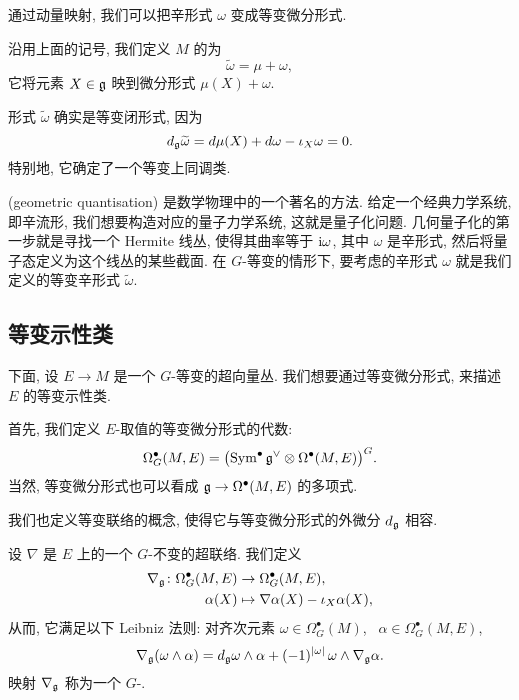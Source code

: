 通过动量映射, 我们可以把辛形式 $\omega$ 变成等变微分形式.

\begin{definition} \label{def-11-equivar-symp-form}
    沿用上面的记号, 我们定义 $M$ 的为
    \[ \widetilde{\omega} = \mu + \omega, \]
    它将元素 $X \in \mathfrak{g}$ 映到微分形式 $\mu (X) + \omega$.
\end{definition}

形式 $\widetilde{\omega}$ 确实是等变闭形式, 因为
\[ d_{\mathfrak{g}} \widetilde{\omega}
    = d \mu (X) + d \omega - \iota_X \omega = 0. \]
特别地, 它确定了一个等变上同调类.

\begin{remark} \label{rmk-11-geo-quant}
     (geometric quantisation) 是数学物理中的一个著名的方法.
    给定一个经典力学系统, 即辛流形, 我们想要构造对应的量子力学系统,
    这就是量子化问题.
    几何量子化的第一步就是寻找一个 Hermite 线丛, 使得其曲率等于 $\mathrm{i} \omega$,
    其中 $\omega$ 是辛形式, 然后将量子态定义为这个线丛的某些截面.
    在 $G$-等变的情形下,
    要考虑的辛形式 $\omega$ 就是我们定义的等变辛形式 $\widetilde{\omega}$.
\end{remark}


\subsection{等变示性类}

下面, 设 $E \to M$ 是一个 $G$-等变的超向量丛.
我们想要通过等变微分形式, 来描述 $E$ 的等变示性类.

首先, 我们定义 $E$-取值的等变微分形式的代数:
\[ \Omega_G^\bullet (M, E) = \bigl( \operatorname{Sym}^\bullet \mathfrak{g}^\vee \otimes 
    \Omega^\bullet (M, E) \bigr)^G . \]
当然, 等变微分形式也可以看成 $\mathfrak{g} \to \Omega^\bullet (M, E)$ 的多项式.

我们也定义等变联络的概念, 使得它与等变微分形式的外微分 $d_{\mathfrak{g}}$ 相容.

\begin{definition}
    设 $\nabla$ 是 $E$ 上的一个 $G$-不变的超联络. 我们定义
    \begin{align*}
        \nabla_{\mathfrak{g}} \colon \Omega_G^\bullet (M, E) &\to \Omega_G^\bullet (M, E), \\
        \alpha (X) &\mapsto \nabla \alpha (X) - \iota_X \alpha (X),
    \end{align*}
    从而, 它满足以下 Leibniz 法则: 对齐次元素
    $\omega \in \Omega_G^\bullet (M)$, \ $\alpha \in \Omega_G^\bullet (M, E)$,
    \[ \nabla_{\mathfrak{g}} (\omega \wedge \alpha)
        = d_{\mathfrak{g}} \omega \wedge \alpha
        + (-1)^{|\omega|} \, \omega \wedge \nabla_{\mathfrak{g}} \alpha. \]
    映射 $\nabla_{\mathfrak{g}}$ 称为一个 $G$-.
\end{definition}

